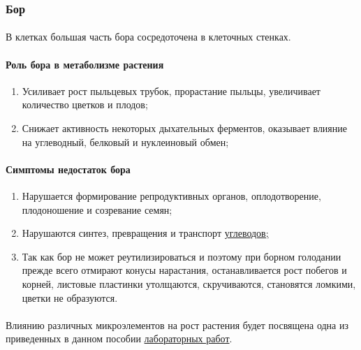 \subsubsection*{Бор}

\paragraph*{}В клетках большая часть бора сосредоточена в клеточных стенках. 

\paragraph*{Роль бора в метаболизме растения}

\begin{enumerate}
\item Усиливает рост пыльцевых трубок, прорастание пыльцы, увеличивает количество цветков и плодов;
\item Снижает активность некоторых дыхательных ферментов, оказывает влияние на углеводный, белковый и нуклеиновый обмен;
\end{enumerate}

\paragraph*{Симптомы недостаток бора}

\begin{enumerate}
\item Нарушается формирование репродуктивных органов, оплодотворение, плодоношение и созревание семян;
\item Нарушаются синтез, превращения и транспорт \hyperlink{sect_glycosids}{углеводов;}
\item Так как бор не может реутилизироваться и поэтому при борном голодании прежде всего отмирают конусы нарастания, останавливается рост побегов и корней, листовые пластинки утолщаются, скручиваются, становятся ломкими, цветки не образуются. 
\end{enumerate}

\paragraph*{}Влиянию различных микроэлементов на рост растения будет посвящена одна из приведенных в данном пособии \hyperlink{mineral_elements_influence}{лабораторных работ}.

